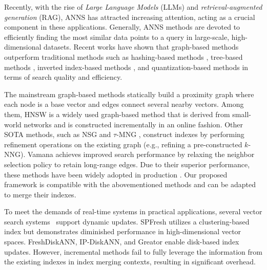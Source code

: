 \documentclass[acmsmall]{acmart}
\theoremstyle{remark}
\theoremstyle{definition}
\begin{document}
Recently, with the rise of \textit{Large Language Models} (LLMs) and \textit{retrieval-augmented generation} (RAG), ANNS \cite{arya1993approximate, yang2025effective, yang2024fast} has attracted increasing attention, acting as a crucial component in these applications. Generally, ANNS methods are devoted to efficiently finding the most similar data points to a query in large-scale, high-dimensional datasets. Recent works \cite{naidan2015permutation,aumuller2020ann} have shown that graph-based methods \cite{fu2017fast,malkov2018efficient,jayaram2019diskann, zhong2025enhancegraph} outperform traditional methods such as hashing-based methods \cite{indyk1998approximate,sun2014srs,huang2015query}, tree-based methods \cite{bentley1975multidimensional,silpa2008optimised,muja2014scalable}, inverted index-based methods \cite{babenko2014inverted,babenko2016efficient,zhang2022bi, li2025sindi}, and quantization-based methods \cite{jegou2010product, ge2013optimized} in terms of search quality and efficiency.

The mainstream graph-based methods \cite{malkov2014approximate,malkov2018efficient,fu2017fast,fu2021high,peng2023efficient,jayaram2019diskann, cai2024navigating} statically build a proximity graph where each node is a base vector and edges connect several nearby vectors. Among them, HNSW \cite{malkov2018efficient} is a widely used graph-based method that is derived from small-world networks and is constructed incrementally in an online fashion. Other SOTA methods, such as NSG \cite{fu2017fast} and $\tau$-MNG \cite{peng2023efficient}, construct indexes by performing refinement operations on the existing graph (e.g., refining a pre-constructed $k$-NNG). Vamana\cite{jayaram2019diskann} achieves improved search performance by relaxing the neighbor selection policy to retain long-range edges. Due to their superior performance, these methods have been widely adopted in production \cite{wang2021milvus, Yang2024EffectiveAG}. Our proposed framework is compatible with the abovementioned methods and can be adapted to merge their indexes.

To meet the demands of real-time systems in practical applications, several vector search systems~\cite{singh2021freshdiskann,xu2023spfresh, zhong2025lsm, yu2025topology, xu2025place} support dynamic updates. SPFresh \cite{xu2023spfresh} utilizes a clustering-based index but demonstrates diminished performance in high-dimensional vector spaces. FreshDiskANN\cite{singh2021freshdiskann}, IP-DiskANN\cite{xu2025place}, and Greator \cite{yu2025topology} enable disk-based index updates. However, incremental methods fail to fully leverage the information from the existing indexes in index merging contexts, resulting in significant overhead.
\end{document}
